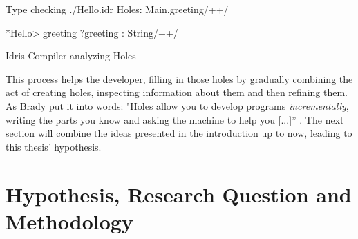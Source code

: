 \begin{GenericCode}[numbers=none]
Type checking ./Hello.idr
Holes: Main.greeting/+\label{lst:idris-holes-listing}+/

*Hello> greeting
?greeting : String/+\label{lst:idris-holes-types}+/
\caption{Idris Compiler analyzing Holes}
\label{fig:idris-compiler-holes}
\end{GenericCode}

This process helps the developer, filling in those holes by gradually combining the act of creating holes, inspecting information about them and then refining them.
As Brady put it into words: "Holes allow you to develop programs \emph{incrementally}, writing the parts you know and asking the machine to help you [...]'' \cite[pp. 21]{brady_type-driven_2017}.
The next section will combine the ideas presented in the introduction up to now, leading to this thesis' hypothesis.

\section{Hypothesis, Research Question and Methodology}

